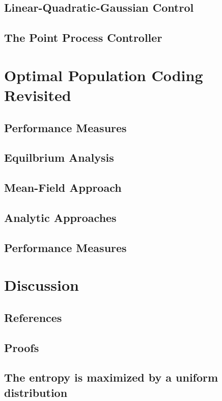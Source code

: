 \documentclass[justified,notitlepage]{tufte-book}   	%
\begin{document}
\section{Linear-Quadratic-Gaussian Control}

\section{The Point Process Controller}

\chapter{Optimal Population Coding Revisited}

\label{chap:optimal}

\section{Performance Measures}

\section{Equilbrium Analysis}

\section{Mean-Field Approach}

\section{Analytic Approaches}

\section{Performance Measures}

\chapter{Discussion}

\section{References}
{}


\begin{appendices}

\chapter{Proofs}
\section{The entropy is maximized by a uniform distribution}
\label{app:entropy}
\end{appendices}
\end{document}
